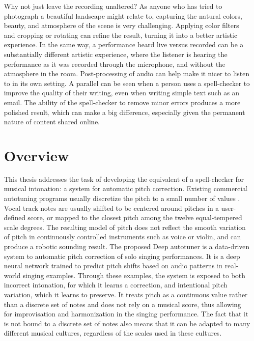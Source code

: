 Why not just leave the recording unaltered? As anyone who has tried to photograph a beautiful landscape might relate to, capturing the natural colors, beauty, and atmosphere of the scene is very challenging. Applying color filters and cropping or rotating can refine the result, turning it into a better artistic experience. In the same way, a performance heard live versus recorded can be a substantially different artistic experience, where the listener is hearing the performance as it was recorded through the microphone, and without the atmosphere in the room. Post-processing of audio can help make it nicer to listen to in its own setting. A parallel can be seen when a person uses a spell-checker to improve the quality of their writing, even when writing simple text such as an email. The ability of the spell-checker to remove minor errors produces a more polished result, which can make a big difference, especially given the permanent nature of content shared online. %

\section{Overview}
This thesis addresses the task of developing the equivalent of a spell-checker for musical intonation: a system for automatic pitch correction. Existing commercial autotuning programs usually discretize the pitch to a small number of values \cite{antares:2016}. Vocal track notes are usually shifted to be centered around pitches in a user-defined score, or mapped to the closest pitch among the twelve equal-tempered scale degrees. The resulting model of pitch does not reflect the smooth variation of pitch in continuously controlled instruments such as voice or violin, and can produce a robotic sounding result. The proposed Deep autotuner is a data-driven system to automatic pitch correction of solo singing performances. It is a deep neural network trained to predict pitch shifts based on audio patterns in real-world singing examples. Through these examples, the system is exposed to both incorrect intonation, for which it learns a correction, and intentional pitch variation, which it learns to preserve. It treats pitch as a continuous value rather than a discrete set of notes and does not rely on a musical score, thus allowing for improvisation and harmonization in the singing performance. The fact that it is not bound to a discrete set of notes also means that it can be adapted to many different musical cultures, regardless of the scales used in these cultures. 

